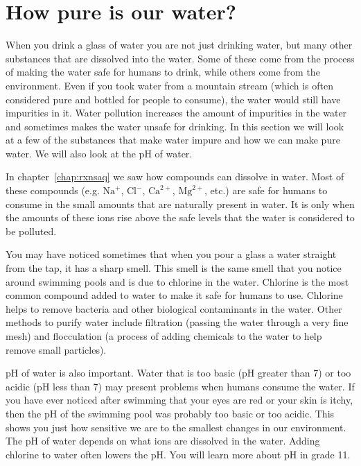 \section{How pure is our water?}
            \nopagebreak
\label{m38138*id0832745}
When you drink a glass of water you are not just drinking water, but many other substances that are dissolved into the water. Some of these come from the process of making the water safe for humans to drink, while others come from the environment. Even if you took water from a mountain stream (which is often considered pure and bottled for people to consume), the water would still have impurities in it. Water pollution increases the amount of impurities in the water and sometimes makes the water unsafe for drinking. In this section we will look at a few of the substances that make water impure and how we can make pure water. We will also look at the pH of water.
\par 
\label{m38138*id08324}
In chapter~\ref{chap:rxnsaq} we saw how compounds can dissolve in water. Most of these compounds (e.g.\@{} ${\text{Na}}^{+}$, ${\text{Cl}}^{-}$, ${\text{Ca}}^{2+}$, ${\text{Mg}}^{2+}$, etc.) are safe for humans to consume in the small amounts that are naturally present in water. It is only when the amounts of these ions rise above the safe levels that the water is considered to be polluted.
\par 
\label{m38138*id08322346}You may have noticed sometimes that when you pour a glass a water straight from the tap, it has a sharp smell. This smell is the same smell that you notice around swimming pools and is due to chlorine in the water. Chlorine is the most common compound added to water to make it safe for humans to use. Chlorine helps to remove bacteria and other biological contaminants in the water. Other methods to purify water include filtration (passing the water through a very fine mesh) and flocculation (a process of adding chemicals to the water to help remove small particles). 
\par 
\label{m38138*id0832}
pH of water is also important. Water that is too basic (pH greater than 7) or too acidic (pH less than 7) may present problems when humans consume the water. If you have ever noticed after swimming that your eyes are red or your skin is itchy, then the pH of the swimming pool was probably too basic or too acidic. This shows you just how sensitive we are to the smallest changes in our environment. The pH of water depends on what ions are dissolved in the water. Adding chlorine to water often lowers the pH. You will learn more about pH in grade 11. 
